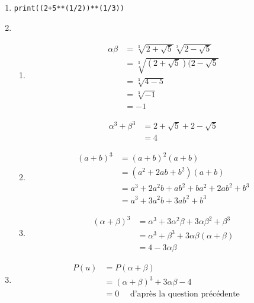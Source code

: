 \begin{correction}
\begin{enumerate}
\item \begin{lstlisting}
print((2+5**(1/2))**(1/3))
\end{lstlisting}
\item \begin{enumerate}
\item \begin{align*}
\alpha \beta &= \sqrt[3]{2+\sqrt{5}}\sqrt[3]{2-\sqrt{5}}\\
					&=\sqrt[3]{(2+\sqrt{5})(2-\sqrt{5}}\\
					&=\sqrt[3]{4-5}\\
					&=\sqrt[3]{-1}\\					
					&=-1
\end{align*}

\begin{align*}
\alpha^3+\beta^3&= 2+\sqrt{5}+2-\sqrt{5}\\
							&=4
\end{align*}


\item 
\begin{align*}
(a+b)^3&=(a+b)^2(a+b)\\
			&=(a^2+2ab+b^2)(a+b)\\
			&=a^3+2a^2b+ab^2+ba^2+2ab^2+b^3\\
			&=a^3+3a^2b+3ab^2+b^3
\end{align*}

\item 
\begin{align*}
(\alpha+\beta)^3& = \alpha^3 +3\alpha^2\beta +3\alpha \beta^2 +\beta^3\\
&=\alpha^3  +\beta^3 +3\alpha\beta(\alpha + \beta)\\
&=4-3\alpha\beta
\end{align*}
\end{enumerate}
\item 
\begin{align*}
P(u) &= P(\alpha+\beta) \\
	&= (\alpha+\beta)^3+3\alpha\beta -4\\
	&=0 \quad \text{ d'après la question précédente}
\end{align*}



\end{enumerate}
\end{correction}
